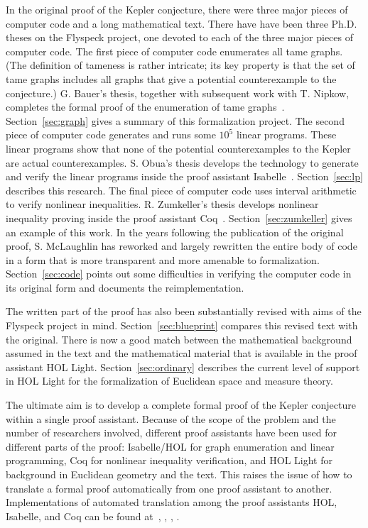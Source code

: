 \documentclass[11pt]{amsart}
\begin{document}
In the original proof of the Kepler conjecture, there were three major pieces of computer code and a long mathematical text.
There have have been three Ph.D. theses on the Flyspeck
project, one devoted to each of the three major pieces of computer code.
The first piece of computer code enumerates all tame graphs.
(The definition of tameness is rather intricate; its key property is that the set of tame graphs 
includes all graphs that give a potential counterexample to the conjecture.)
G. Bauer's thesis, together with subsequent 
work with T. Nipkow, completes the formal
proof of the enumeration of tame graphs~\cite{NipkowBS-IJCAR06}.
Section~\ref{sec:graph} gives a summary of this formalization project.
The second piece of computer code generates and runs some $10^5$ linear
programs.   These linear programs show that none of the potential counterexamples
to the Kepler are actual counterexamples.  S. Obua's thesis develops the
technology to generate and verify the linear programs inside the proof assistant Isabelle~\cite{obua:phd}. 
Section~\ref{sec:lp} describes this research.
The final piece of computer code uses interval arithmetic to verify nonlinear inequalities.  R. Zumkeller's thesis develops nonlinear inequality proving inside the proof assistant Coq~\cite{roland-thesis}.  Section~\ref{sec:zumkeller} gives an example of this work.  In the years following the publication of the original proof, S. McLaughlin has  reworked and largely rewritten the entire body of code in a form that is more transparent and more amenable to formalization.  Section~\ref{sec:code} points out some difficulties
in verifying the computer code in its original form and
documents the reimplementation.

The written part of the proof has also been substantially revised with aims of the Flyspeck project in mind.   Section~\ref{sec:blueprint} compares this revised text with the original.  There is now a good match between the mathematical background assumed in the text and the mathematical material that is available in the proof assistant HOL Light.  Section~\ref{sec:ordinary} describes the current level of support in HOL Light for the formalization of Euclidean space and measure theory.

The ultimate aim is to develop a complete formal proof of the Kepler
conjecture within a single proof assistant.  Because of the scope of 
the problem and the number of researchers involved, different proof
assistants have been used for different parts of the proof:
Isabelle/HOL for graph enumeration and linear programming, Coq for
nonlinear inequality verification, and HOL Light for background
in Euclidean geometry and the text.  This raises the issue of how
to translate a formal proof automatically from one proof assistant to another.
Implementations of automated translation among the
proof assistants HOL, Isabelle, and Coq can be found 
at~\cite{obua:import}, \cite{McLaughlin:2006:IJCAR}, \cite{wiedijk:encoding},
\cite{695027}.
\end{document}

